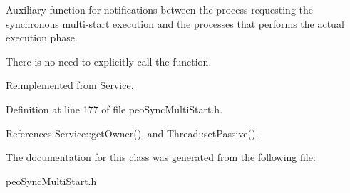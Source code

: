 Auxiliary function for notifications between the process requesting the synchronous multi-start execution and the processes that performs the actual execution phase. 

There is no need to explicitly call the function. 

Reimplemented from \hyperlink{classService_f94cc8a5c2665d4574041737e61e9ffc}{Service}.

Definition at line 177 of file peo\-Sync\-Multi\-Start.h.

References Service::get\-Owner(), and Thread::set\-Passive().

The documentation for this class was generated from the following file:\begin{CompactItemize}
\item 
peo\-Sync\-Multi\-Start.h\end{CompactItemize}
